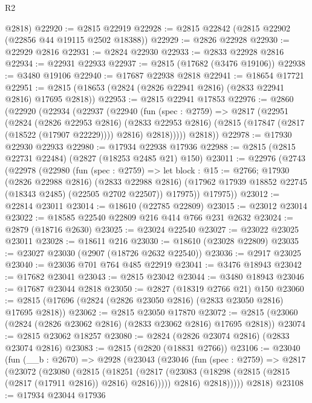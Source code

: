 \begin{lexlean}{R2}
\begin{coremodule}
      @2818)
@22920 := @2815 @22919
@22928 := @2815 @22842 (@2815 @22902 (@22856 @44 @19115 @2502 @18388))
@22929 := @2826 @22928
@22930 := @22929 @2816
@22931 := @2824 @22930
@22933 := @2833 @22928 @2816
@22934 := @22931 @22933
@22937 := @2815 (@17682 (@3476 @19106))
@22938 := @3480 @19106
@22940 := @17687 @22938 @2818
@22941 := @18654 @17721
@22951 := @2815 (@18653 (@2824 (@2826 @22941 @2816) (@2833 @22941 @2816) @17695 @2818))
@22953 := @2815 @22941 @17853
@22976 := @2860
    (@22920
      (@22934
        (@22937
          (@22940
            (fun (spec : @2759) =>
            @2817
              (@22951
                (@2824
                  (@2826 @22953 @2816)
                  (@2833 @22953 @2816)
                  (@2815 (@17847 (@2817 (@18522 (@17907 @22229)))) @2816)
                  @2818)))))
        @2818))
@22978 := @17930 @22930 @22933
@22980 := @17934 @22938 @17936
@22988 := @2815 (@2815 @22731 @22484) (@2827 (@18253 @2485 @21) @150)
@23011 := @22976
    (@2743
      (@22978
        (@22980
          (fun (spec : @2759) =>
          let block : @15 := @2766;
          @17930
            (@2826 @22988 @2816)
            (@2833 @22988 @2816)
            (@17962 @17939 @18852 @22745 (@18343 @2485) (@22505 @2702 @22507))
            @17975))
        @17975))
@23012 := @22814 @23011
@23014 := @18610 (@22785 @22809)
@23015 := @23012 @23014
@23022 := @18585 @22540 @22809 @216 @414 @766 @231 @2632
@23024 := @2879 (@18716 @2630)
@23025 := @23024 @22540
@23027 := @23022 @23025 @23011
@23028 := @18611 @216
@23030 := @18610 (@23028 @22809)
@23035 := @23027 @23030 (@2907 (@18726 @2632 @22540))
@23036 := @2917 @23025
@23040 := @23036 @701 @764 @485 @22919
@23041 := @3476 @18943
@23042 := @17682 @23041
@23043 := @2815 @23042
@23044 := @3480 @18943
@23046 := @17687 @23044 @2818
@23050 := @2827 (@18319 @2766 @21) @150
@23060 := @2815 (@17696 (@2824 (@2826 @23050 @2816) (@2833 @23050 @2816) @17695 @2818))
@23062 := @2815 @23050 @17870
@23072 := @2815 (@23060 (@2824 (@2826 @23062 @2816) (@2833 @23062 @2816) @17695 @2818))
@23074 := @2815 @23062 @18257
@23080 := @2824 (@2826 @23074 @2816) (@2833 @23074 @2816)
@23083 := @2815 (@2820 (@18831 @2766))
@23106 := @23040
    (fun (__b : @2670) =>
    @2928
      (@23043
        (@23046
          (fun (spec : @2759) =>
          @2817
            (@23072
              (@23080
                (@2815
                  (@18251
                    (@2817 (@23083 (@18298 (@2815 (@2815 (@2817 (@17911 @2816)) @2816) @2816)))))
                  @2816)
                @2818)))))
      @2818)
@23108 := @17934 @23044 @17936

\end{coremodule}
\end{lexlean}
